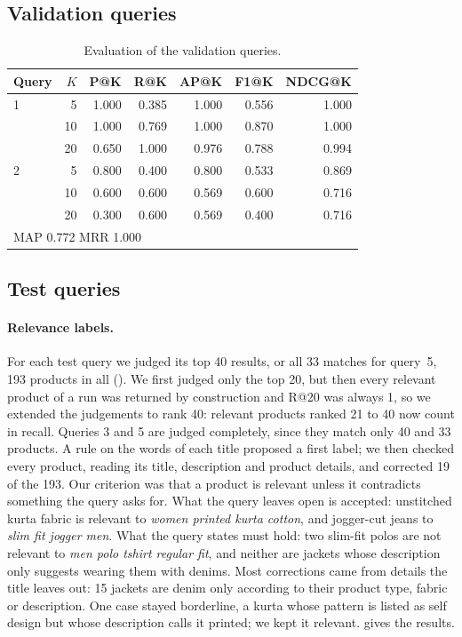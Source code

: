 \documentclass[11pt,a4paper]{article}
\begin{document}
\subsection{Validation queries}

\begin{table}[htbp]
  \centering
  \caption{Evaluation of the validation queries.}
  \label{tab:validation}
  \begin{tabular}{lrrrrrr}
    \toprule
    Query & $K$ & P@K & R@K & AP@K & F1@K & NDCG@K \\
    \midrule
    1 & 5  & 1.000 & 0.385 & 1.000 & 0.556 & 1.000 \\
      & 10 & 1.000 & 0.769 & 1.000 & 0.870 & 1.000 \\
      & 20 & 0.650 & 1.000 & 0.976 & 0.788 & 0.994 \\
    \midrule
    2 & 5  & 0.800 & 0.400 & 0.800 & 0.533 & 0.869 \\
      & 10 & 0.600 & 0.600 & 0.569 & 0.600 & 0.716 \\
      & 20 & 0.300 & 0.600 & 0.569 & 0.400 & 0.716 \\
    \midrule
    \multicolumn{7}{l}{MAP 0.772 \qquad MRR 1.000} \\
    \bottomrule
  \end{tabular}
\end{table}

\subsection{Test queries}

\paragraph{Relevance labels.} For each test query we judged its top 40
results, or all 33 matches for query~5, 193 products in all
(). We first judged only the top 20, but then every
relevant product of a run was returned by construction and R@20 was always 1,
so we extended the judgements to rank 40: relevant products ranked 21 to 40 now
count in recall. Queries 3 and 5 are judged completely, since they match only
40 and 33 products. A rule on the words of each title proposed a first label;
we then checked every product, reading its title, description and product
details, and corrected 19 of the 193. Our
criterion was that a product is relevant unless it contradicts something the
query asks for. What the query leaves open is accepted: unstitched kurta fabric
is relevant to \emph{women printed kurta cotton}, and jogger-cut jeans to
\emph{slim fit jogger men}. What the query states must hold: two slim-fit polos
are not relevant to \emph{men polo tshirt regular fit}, and neither are
jackets whose description only suggests wearing them with denims. Most
corrections came from details the title leaves out: 15 jackets are denim only
according to their product type, fabric or description. One case stayed borderline, a kurta whose pattern is
listed as self design but whose description calls it printed; we kept it
relevant.  gives the results.
\end{document}

